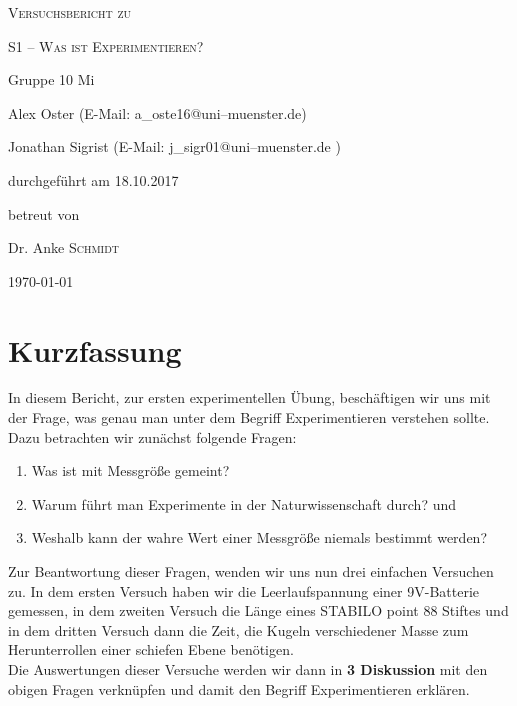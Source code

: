 \documentclass[11pt,a4paper,titlepage, ngerman]{article}
\begin{document}
	
\begin{titlepage}
	\centering
	{\scshape\LARGE Versuchsbericht zu \par}
	\vspace{1cm}
	{\scshape\huge S1 -- Was ist Experimentieren?\par}
	\vspace{2.5cm}
	{\LARGE Gruppe 10 Mi\par}
	\vspace{0.5cm}
	{\large Alex Oster (E-Mail: a\_oste16@uni--muenster.de) \par}
	{\large Jonathan Sigrist (E-Mail: j\_sigr01@uni--muenster.de ) \par}
	\vfill
	durchgeführt am 18.10.2017\par
	betreut von\par
	{\large Dr. Anke \textsc{Schmidt}}

	\vfill

	{\large \today\par}
\end{titlepage}


\tableofcontents

\newpage

\section{Kurzfassung}

	In diesem Bericht, zur ersten experimentellen Übung, beschäftigen wir uns mit der Frage, was genau man unter dem Begriff \glqq Experimentieren\grqq {} verstehen sollte. Dazu betrachten wir zunächst folgende Fragen: \\
	\begin{enumerate}
		 \item Was ist mit \glqq Messgröße\grqq {} gemeint? \\
		 \item Warum führt man Experimente in der Naturwissenschaft durch? und\\
		 \item Weshalb kann der \glqq wahre Wert\grqq {} einer Messgröße niemals bestimmt werden?
	\end{enumerate}
	Zur Beantwortung dieser Fragen, wenden wir uns nun drei einfachen Versuchen zu. In dem ersten Versuch haben wir die Leerlaufspannung einer 9V-Batterie gemessen, in dem zweiten Versuch die Länge eines \glqq STABILO point 88\grqq {} Stiftes und in dem dritten Versuch dann die Zeit, die Kugeln verschiedener Masse zum Herunterrollen einer schiefen Ebene benötigen. \\
	Die Auswertungen dieser Versuche werden wir dann in \textbf{3 Diskussion} mit den obigen Fragen verknüpfen und damit den Begriff \glqq Experimentieren\grqq {} erklären.
\end{document}

